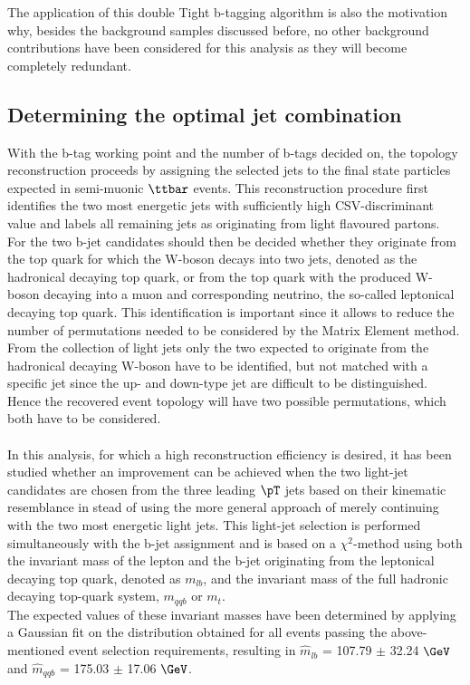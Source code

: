 The application of this double Tight b-tagging algorithm is also the motivation why, besides the background samples discussed before, no other background contributions have been considered for this analysis as they will become completely redundant.

\subsection{Determining the optimal jet combination}
With the b-tag working point and the number of b-tags decided on, the topology reconstruction proceeds by assigning the selected jets to the final state particles expected in semi-muonic $\ttbar$ events.
This reconstruction procedure first identifies the two most energetic jets with sufficiently high CSV-discriminant value and labels all remaining jets as originating from light flavoured partons.
\\
For the two b-jet candidates should then be decided whether they originate from the top quark for which the W-boson decays into two jets, denoted as the hadronical decaying top quark, or from the top quark with the produced W-boson decaying into a muon and corresponding neutrino, the so-called leptonical decaying top quark.
This identification is important since it allows to reduce the number of permutations needed to be considered by the Matrix Element method.
From the collection of light jets only the two expected to originate from the hadronical decaying W-boson have to be identified, but not matched with a specific jet since the up- and down-type jet are difficult to be distinguished. Hence the recovered event topology will have two possible permutations, which both have to be considered.
\\
\\
In this analysis, for which a high reconstruction efficiency is desired, it has been studied whether an improvement can be achieved when the two light-jet candidates are chosen from the three leading $\pT$ jets based on their kinematic resemblance in stead of using the more general approach of merely continuing with the two most energetic light jets.
This light-jet selection is performed simultaneously with the b-jet assignment and is based on a $\chi^{2}$-method using both the invariant mass of the lepton and the b-jet originating from the leptonical decaying top quark, denoted as $m_{lb}$, and the invariant mass of the full hadronic decaying top-quark system, $m_{qqb}$ or $m_{t}$.
\\
The expected values of these invariant masses have been determined by applying a Gaussian fit on the distribution obtained for all events passing the above-mentioned event selection requirements, resulting in $\hat{m}_{lb}$ =  107.79 $\pm$ 32.24 $\GeV$ and $\hat{m}_{qqb}$ = 175.03 $\pm$ 17.06 $\GeV$.
